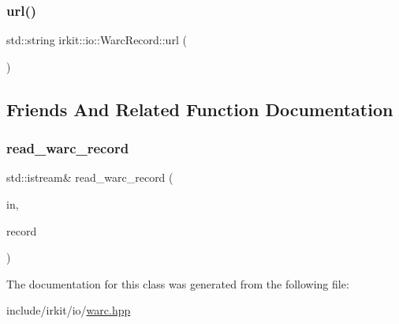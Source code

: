 \mbox{\label{classirkit_1_1io_1_1WarcRecord_a7d35908f4e778d1f453ced390cc41d23}} 
\subsubsection{\texorpdfstring{url()}{url()}}
{\footnotesize\ttfamily std\+::string irkit\+::io\+::\+Warc\+Record\+::url (\begin{DoxyParamCaption}{ }\end{DoxyParamCaption})\hspace{0.3cm}{\ttfamily [inline]}}



\subsection{Friends And Related Function Documentation}
\mbox{\label{classirkit_1_1io_1_1WarcRecord_aadc413d200017bd8aa5b5236a1158cfd}} 
\subsubsection{\texorpdfstring{read\+\_\+warc\+\_\+record}{read\_warc\_record}}
{\footnotesize\ttfamily std\+::istream\& read\+\_\+warc\+\_\+record (\begin{DoxyParamCaption}\item[{std\+::istream \&}]{in,  }\item[{\mbox{\hyperlink{classirkit_1_1io_1_1WarcRecord}{Warc\+Record}} \&}]{record }\end{DoxyParamCaption})\hspace{0.3cm}{\ttfamily [friend]}}



The documentation for this class was generated from the following file\+:\begin{DoxyCompactItemize}
\item 
include/irkit/io/\mbox{\hyperlink{warc_8hpp}{warc.\+hpp}}\end{DoxyCompactItemize}
